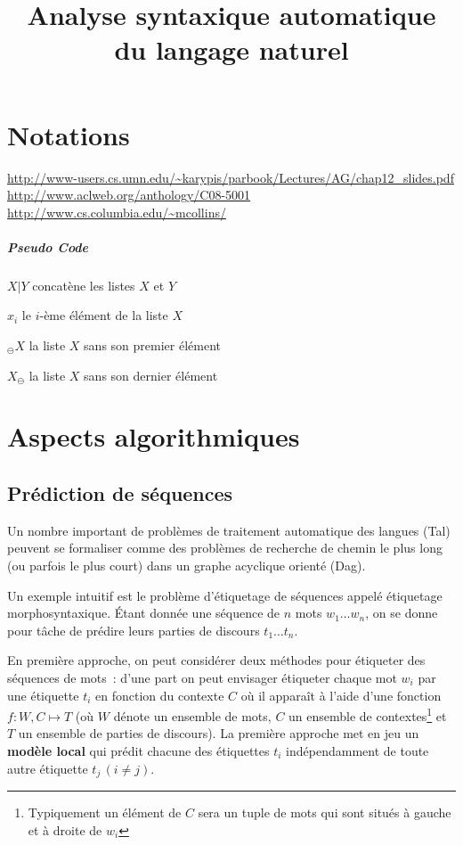 \documentclass[11pt,openany]{book}
\title{Analyse syntaxique automatique du langage naturel}
\newcommand{\ac}[1]{{\sc #1}} %
\begin{document}
\chapter*{Notations}

\url{http://www-users.cs.umn.edu/~karypis/parbook/Lectures/AG/chap12_slides.pdf}
\url{http://www.aclweb.org/anthology/C08-5001}
\url{http://www.cs.columbia.edu/~mcollins/}

\paragraph{Pseudo Code}
\begin{description}
\item $X|Y$ concatène les listes $X$ et $Y$
\item $x_i$ le $i$-ème élément de la liste $X$
\item $_{\ominus}X$ la liste $X$ sans son premier élément
\item $X_{\ominus}$ la liste $X$ sans son dernier élément
\end{description}
 

\chapter{Aspects algorithmiques}

\section{Prédiction de séquences}
Un nombre important de problèmes de traitement automatique des langues (\ac{Tal}) peuvent se formaliser comme des problèmes de recherche de chemin le plus long (ou parfois le plus court) dans un graphe acyclique orienté (\ac{Dag}).

Un exemple intuitif est le problème d'étiquetage de séquences appelé étiquetage morphosyntaxique. \'{E}tant donnée une séquence de $n$ mots $w_1\ldots w_n$,  on se donne pour tâche de prédire leurs parties de discours $t_1\ldots t_n$. 

En première approche, on peut considérer deux méthodes pour  étiqueter des séquences de mots~: d'une part on peut envisager étiqueter chaque mot $w_i$ par une étiquette $t_i$ en fonction du contexte $C$ où il apparaît à l'aide d'une fonction $f: W, C \mapsto T$ (où $W$ dénote un ensemble de mots, $C$ un ensemble de contextes\footnote{Typiquement un élément de $C$ sera un tuple de mots qui sont situés à gauche et à droite de $w_i$} et $T$ un ensemble de parties de discours). La première approche met en jeu  un {\bf modèle local} qui prédit  chacune des étiquettes $t_i$ indépendamment de toute autre étiquette $t_j\, (i\not = j)$.
\end{document}
